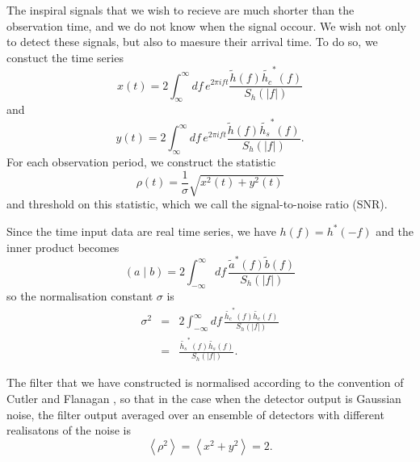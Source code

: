The inspiral signals that we wish to recieve are much shorter than the
observation time, and we do not know when the signal occour. We wish not only
to detect these signals, but also to maesure their arrival time. To do so, we
constuct the time series
\begin{equation}
x(t) = 2 \int_{\infty}^{\infty}df\,e^{2\pi i f t} 
\frac{\tilde{h}(f) \tilde{h_c}^\ast(f)}{S_h\left(\left|f\right|\right)}
\end{equation}
and
\begin{equation}
y(t) = 2 \int_{\infty}^{\infty}df\,e^{2\pi i f t} 
\frac{\tilde{h}(f) \tilde{h_s}^\ast(f)}{S_h\left(\left|f\right|\right)}.
\end{equation}
For each observation period, we construct the statistic
\begin{equation}
\rho(t) = \frac{1}{\sigma}\sqrt{x^2(t) + y^2(t)}
\end{equation}
and threshold on this statistic, which we call the signal-to-noise ratio
(SNR).

Since the time input data are real time series, we have $h(f) = h^\ast(-f)$
and the inner product becomes
\begin{equation}
\left(a\mid b\right) = 2 \int_{-\infty}^{\infty}df\,
\frac{\tilde{a}^\ast(f)\tilde{b}(f)}{S_h\left(\left|f\right|\right)}
\end{equation}
so the normalisation constant $\sigma$ is
\begin{eqnarray}
\sigma^2 &=& 2 \int_{-\infty}^{\infty}df\,
\frac{\tilde{h_c}^\ast(f)\tilde{h_c}(f)}{S_h\left(\left|f\right|\right)} \\
&=& \frac{\tilde{h_s}^\ast(f)\tilde{h_s}(f)}{S_h\left(\left|f\right|\right)}.
\end{eqnarray}

The filter that we have constructed is normalised according to the convention
of Cutler and Flanagan \cite{cutflan}, so that in the case when the detector
output is Gaussian noise, the filter output averaged over an ensemble of
detectors with different realisatons of the noise is
\begin{equation}
\left\langle \rho^2 \right\rangle = \left\langle x^2 + y^2 \right\rangle = 2.
\end{equation}

